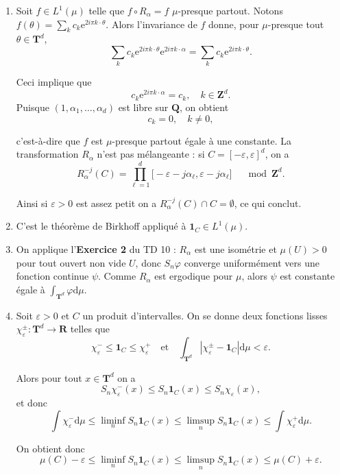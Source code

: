 \documentclass[a4paper,12pt,openany]{article}
\theoremstyle{plain}
\theoremstyle{definition}
\newcommand{\e}{\mathrm{e}}
\newcommand{\dd}{\mathrm{d}}
\newcommand{\T}{\mathbf{T}}
\newcommand{\R}{\mathbf{R}}
\newcommand{\Q}{\mathbf{Q}}
\newcommand{\Z}{\mathbf{Z}}
\begin{document}
\begin{enumerate}
\item Soit $f \in L^1(\mu)$ telle que $f \circ R_\alpha = f$ $\mu$-presque partout.  Notons $f(\theta) = \sum_{k} c_k \e^{2i\pi k \cdot \theta}$.  Alors l'invariance de $f$ donne, pour $\mu$-presque tout $\theta \in \T^d$,
$$
\sum_k c_k \e^{2i\pi k \cdot \theta} \e^{2i \pi k \cdot \alpha} = \sum_{k} c_k \e^{2i\pi k \cdot \theta}.
$$

Ceci implique que 
$$c_k \e^{2i\pi k \cdot \alpha} = c_k, \quad k \in \Z^d.$$
 Puisque $(1, \alpha_1, \dots, \alpha_d)$ est libre sur $\Q$, on obtient
$$
c_k = 0, \quad k \neq 0,
$$

c'est-\`a-dire que $f$ est $\mu$-presque partout \'egale \`a une constante.  La transformation $R_\alpha$ n'est pas m\'elangeante : si $C = [-\varepsilon, \varepsilon]^d$, on a 
$$R_\alpha^{-j}(C) = \prod_{\ell = 1}^d \bigl[-\varepsilon - j\alpha_\ell, \varepsilon-j\alpha_\ell\bigr] \quad \mod \Z^d.$$



Ainsi si $\varepsilon > 0$ est assez petit on a $R_{\alpha}^{-j}(C) \cap C = \emptyset$, ce qui conclut. 
\item C'est le th\'eor\`eme de Birkhoff appliqu\'e \`a $\textbf{1}_C \in L^1(\mu)$.
\item On applique l'\textbf{Exercice 2} du TD 10 : $R_\alpha$ est une isom\'etrie et $\mu(U) > 0$ pour tout ouvert non vide $U$, donc $S_n\varphi$ converge uniform\'ement vers une fonction continue $\psi$.  Comme $R_\alpha$ est ergodique pour $\mu$, alors $\psi$ est constante \'egale \`a $\int_{\T^d} \varphi \dd \mu.$

\item Soit $\varepsilon > 0$ et $C$ un produit d'intervalles. On se donne deux fonctions lisses $\chi_\varepsilon^\pm : \T^d \to \R$ telles que 
$$
\chi_\varepsilon^{-} \leqslant \textbf{1}_C \leqslant \chi_\varepsilon^+ \quad \text{et} \quad \int_{\T^d} |\chi_\varepsilon^\pm - \textbf{1}_C|\dd \mu < \varepsilon.
$$

Alors pour tout $x \in \T^d$ on a 
$$
S_n \chi_\varepsilon^{-}(x) \leqslant S_n \textbf{1}_C(x) \leqslant S_n \chi_\varepsilon(x),
$$
 et donc
$$
\int \chi_\varepsilon^- \dd \mu \leqslant \liminf_n S_n \textbf{1}_C(x) \leqslant \limsup_n S_n \textbf{1}_C(x) \leqslant \int \chi_\varepsilon^+ \dd \mu.
$$




On obtient donc
$$
\mu(C) - \varepsilon \leqslant \liminf_n S_n \textbf{1}_C(x) \leqslant \limsup_n S_n \textbf{1}_C(x) \leqslant \mu(C) + \varepsilon.
$$


\end{enumerate}
\end{document}
